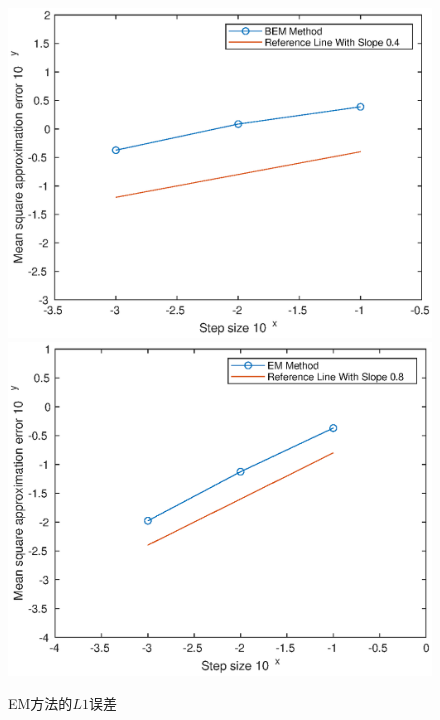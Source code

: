 \documentclass[12pt,final]{article}
\numberwithin{equation}{section}
\numberwithin{figure}{section}
\numberwithin{table}{section}
\theoremstyle{plain}
\theoremstyle{Definition}
\theoremstyle{Remark}
\begin{document}
	
	\begin{figure}[htp!]
		\centering
		\includegraphics[width=0.45\linewidth]{alpha=0.4.eps}
		\hfill
		\includegraphics[width=0.45\linewidth]{alpha=0.8.eps}
		\caption{EM方法的$L1$误差}
		\label{fig:image}
		\vspace{-2ex}
		{}\end{figure}
	
	
\end{document}
